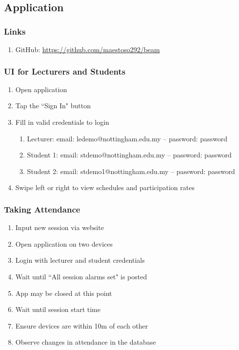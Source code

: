 \documentclass[../report.tex]{subfiles}
\begin{document}
\subsection{Application}
\subsubsection{Links}
\begin{enumerate}
\item GitHub: \url{https://github.com/maestoso292/beam}
\end{enumerate}

\subsubsection{UI for Lecturers and Students}
\begin{enumerate}
\item Open application
\item Tap the ``Sign In" button
\item Fill in valid credentials to login
\begin{enumerate}
\item Lecturer: email: ledemo@nottingham.edu.my -- password: password
\item Student 1: email: stdemo@nottingham.edu.my -- password: password
\item Student 2: email: stdemo1@nottingham.edu.my -- password: password
\end{enumerate}
\item Swipe left or right to view schedules and participation rates
\end{enumerate}

\subsubsection{Taking Attendance}
\begin{enumerate}
\item Input new session via website
\item Open application on two devices
\item Login with lecturer and student credentials
\item Wait until ``All session alarms set" is posted
\item App may be closed at this point
\item Wait until session start time
\item Ensure devices are within 10m of each other
\item Observe changes in attendance in the database
\end{enumerate}
\end{document}

